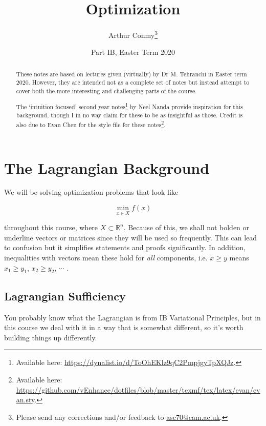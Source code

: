 \documentclass[11pt]{scrartcl}
\begin{document}
\title{Optimization}
\author{Arthur Conmy\footnote{Please send any corrections and/or feedback to \url{asc70@cam.ac.uk}.}}
\date{Part IB, Easter Term 2020}

\maketitle

\begin{abstract}
These notes are based on lectures given (virtually) by Dr M. Tehranchi in Easter term 2020. However, they are intended not as a complete set of notes but instead attempt to cover both the more interesting and challenging parts of the course.

The `intuition focused' second year notes\footnote{Available here: \url{https://dynalist.io/d/ToOhEKlz9qC2PmpjgyTpXQJz}.} by Neel Nanda provide inspiration for this background, though I in no way claim for these to be as insightful as those. Credit is also due to Evan Chen for the style file for these notes\footnote{Available here: \url{https://github.com/vEnhance/dotfiles/blob/master/texmf/tex/latex/evan/evan.sty}.}.
\end{abstract}

\section{The Lagrangian Background}

We will be solving optimization problems that look like

\begin{equation}
    \min_{x \in X} f(x)
\label{The Primal Problem}
\end{equation}

throughout this course, where $X \subset \mathbb{R}^n$. Because of this, we shall not bolden or underline vectors or matrices since they will be used so frequently. This can lead to confusion but it simplifies statements and proofs significantly. In addition, inequalities with vectors mean these hold for \emph{all} components, i.e. $x \ge y$ means $x_1 \ge y_1$, $x_2 \ge y_2$, $\cdots$ .

\subsection{Lagrangian Sufficiency}

You probably know what the Lagrangian is from IB Variational Principles, but in this course we deal with it in a way that is somewhat different, so it's worth building things up differently.
\end{document}
